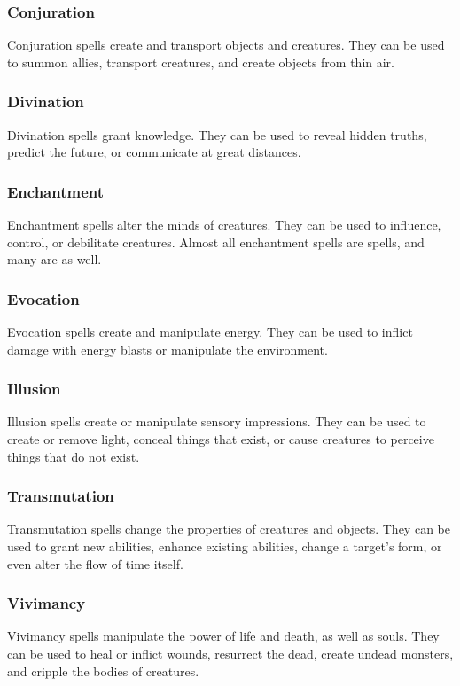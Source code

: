         \subsubsection{Conjuration}
            Conjuration spells create and transport objects and creatures.
            They can be used to summon allies, transport creatures, and create objects from thin air.

        \subsubsection{Divination}
            Divination spells grant knowledge.
            They can be used to reveal hidden truths, predict the future, or communicate at great distances.

        \subsubsection{Enchantment}
            Enchantment spells alter the minds of creatures.
            They can be used to influence, control, or debilitate creatures.
            Almost all enchantment spells are  spells, and many are  as well.

        \subsubsection{Evocation}
            Evocation spells create and manipulate energy.
            They can be used to inflict damage with energy blasts or manipulate the environment.

        \subsubsection{Illusion}
            Illusion spells create or manipulate sensory impressions.
            They can be used to create or remove light, conceal things that exist, or cause creatures to perceive things that do not exist.

        \subsubsection{Transmutation}
            Transmutation spells change the properties of creatures and objects.
            They can be used to grant new abilities, enhance existing abilities, change a target's form, or even alter the flow of time itself.

        \subsubsection{Vivimancy}
            Vivimancy spells manipulate the power of life and death, as well as souls.
            They can be used to heal or inflict wounds, resurrect the dead, create undead monsters, and cripple the bodies of creatures.

